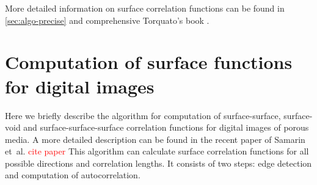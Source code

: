 \documentclass[reprint,amsmath,amssymb,aps,pre,showkeys,showpacs]{revtex4-1}
\begin{document}
More detailed information on surface correlation functions can be found in
\cref{sec:algo-precise} and comprehensive Torquato's book \cite{Torquato_book}.

\section{Computation of surface functions for digital images}
\label{sec:algo}
Here we briefly describe the algorithm for computation of surface-surface,
surface-void and surface-surface-surface correlation functions for digital
images of porous media. A more detailed description can be found in the recent paper of
Samarin et~al. \textcolor{red}{cite paper} This algorithm can calculate surface
correlation functions for all possible directions and correlation lengths. It
consists of two steps: edge detection and computation of autocorrelation.
\end{document}

